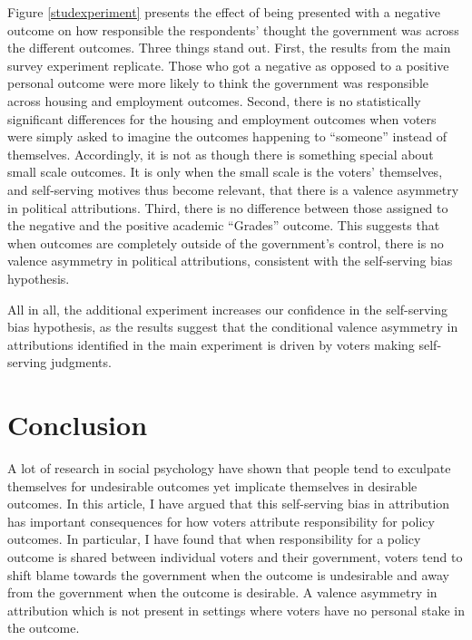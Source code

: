 \documentclass[a4paper,11pt]{article}
\begin{document}
	Figure \ref{studexperiment} presents the effect of being presented with a negative outcome on how responsible the respondents' thought the government was across the different outcomes. Three things stand out. First, the results from the main survey experiment replicate. Those who got a negative as opposed to a positive personal outcome were more likely to think the government was responsible across housing and employment outcomes. Second, there is no statistically significant differences for the housing and employment outcomes when voters were simply asked to imagine the outcomes happening to ``someone'' instead of themselves. Accordingly, it is not as though there is something special about small scale outcomes. It is only when the small scale is the voters' themselves, and self-serving motives thus become relevant, that there is a valence asymmetry in political attributions. Third, there is no difference between those assigned to the negative and the positive academic ``Grades'' outcome. This suggests that when outcomes are completely outside of the government's control, there is no valence asymmetry in political attributions, consistent with the self-serving bias hypothesis.
	
	All in all, the additional experiment increases our confidence in the self-serving bias hypothesis, as the results suggest that the conditional valence asymmetry in attributions identified in the main experiment is driven by voters making self-serving judgments.
	
	\section{Conclusion}
	A lot of research in social psychology have shown that people tend to exculpate themselves for undesirable outcomes yet implicate themselves in desirable outcomes. In this article, I have argued that this self-serving bias in attribution has important consequences for how voters attribute responsibility for policy outcomes. In particular, I have found that when responsibility for a policy outcome is shared between individual voters and their government, voters tend to shift blame towards the government when the outcome is undesirable and away from the government when the outcome is desirable. A valence asymmetry in attribution which is not present in settings where voters have no personal stake in the outcome. 
	
\end{document}
